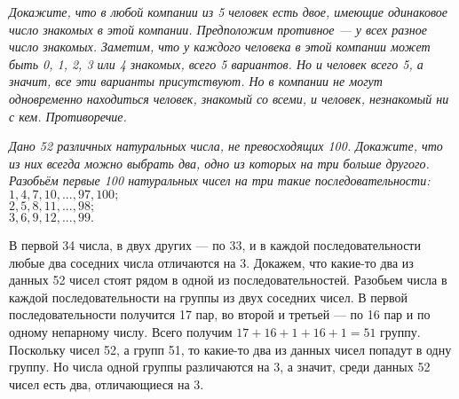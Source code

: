 \documentclass[12pt,a4paper]{article}
\begin{document}



\em
Докажите, что в любой компании из 5 человек есть двое, имеющие одинаковое число знакомых в этой компании.
Предположим противное --- у всех разное число знакомых. Заметим, что у каждого человека в этой компании может быть 0, 1, 2, 3 или 4 знакомых, всего 5 вариантов. Но и человек всего 5, а значит, все эти варианты присутствуют.
Но в компании не могут одновременно находиться человек, знакомый со всеми, и человек, незнакомый ни с кем. Противоречие.

\em
Дано 52 различных натуральных числа, не превосходящих 100. Докажите, что из них всегда можно выбрать два, одно из которых на три больше другого.
 Разобьём первые 100 натуральных чисел на три такие последовательности:\\
\hspace*{8cm}$1,4, 7,10,..., 97, 100;$\\
\hspace*{8cm}$2,	5, 8,11,..., 98;$\\
\hspace*{8cm}$3,	6, 9,12,..., 99.$

\noindent
В первой 34 числа, в двух других --- по 33, и в каждой последовательности любые два соседних числа отличаются на 3. Докажем, что какие-то два из данных 52 чисел стоят рядом в одной из последовательностей. Разобьем числа в каждой последовательности на группы из двух соседних чисел. В первой последовательности получится 17 пар, во второй и третьей --- по 16 пар и по одному непарному числу. Всего получим $17+16+1+16+1=51$ группу. Поскольку чисел 52, а групп 51, то какие-то два из данных чисел попадут в одну группу. Но числа одной группы различаются на 3, а значит, среди данных 52 чисел есть два, отличающиеся на 3.
\end{document}
